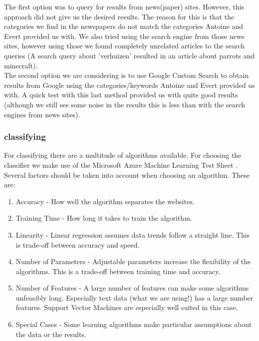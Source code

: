 The first option was to query for results from news(paper) sites. However, this approach did not give us the desired results. The reason for this is that the categories we find in the newspapers do not match the categories Antoine and Evert provided us with. We also tried using the search engine from those news sites, however using those we found completely unrelated articles to the search queries (A search query about 'verhuizen' resulted in an article about parrots and minecraft).\\

The second option we are considering is to use Google Custom Search to obtain results from Google using the categories/keywords Antoine and Evert provided us with. A quick test with this last method provided us with quite good results (although we still see some noise in the results this is less than with the search engines from news sites).\\


\subsubsection{classifying}
For classifying there are a multitude of algorithms available. For choosing the classifier we make use of the Microsoft Azure Machine Learning Test Sheet \cite{MLCheatSheet}. Several factors should be taken into account when choosing an algorithm. These are:
    \begin{enumerate}
        \item Accuracy - How well the algorithm separates the websites.
        \item Training Time - How long it takes to train the algorithm.
        \item Linearity - Linear regression assumes data trends follow a straight line. This is trade-off between accuracy and speed.
        \item Number of Parameters - Adjustable parameters increase the flexibility of the algorithms. This is a trade-off between training time and accuracy.
        \item Number of Features - A large number of features can make some algorithms unfeasibly long. Especially text data (what we are using!) has a large number features. Support Vector Machines are especially well suited in this case.
        \item Special Cases - Some learning algorithms make particular assumptions about the data or the results.
    \end{enumerate}
    
